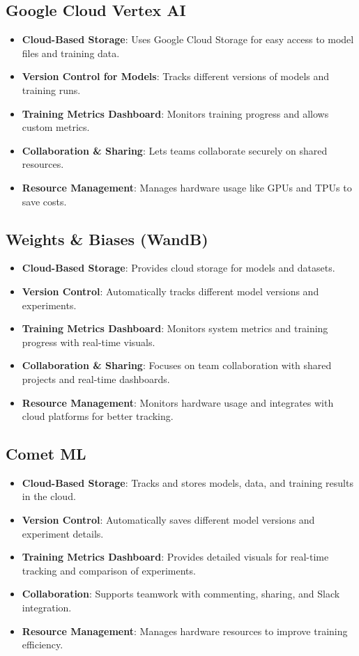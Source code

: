 \documentclass[12pt]{article}
\begin{document}
\subsection*{Google Cloud Vertex AI}
\begin{itemize}
    \item \textbf{Cloud-Based Storage}: Uses Google Cloud Storage for easy access to model files and training data.
    \item \textbf{Version Control for Models}: Tracks different versions of models and training runs.
    \item \textbf{Training Metrics Dashboard}: Monitors training progress and allows custom metrics.
    \item \textbf{Collaboration \& Sharing}: Lets teams collaborate securely on shared resources.
    \item \textbf{Resource Management}: Manages hardware usage like GPUs and TPUs to save costs.
\cite{gcv}
    
\end{itemize}

\subsection*{Weights \& Biases (WandB)}
\begin{itemize}
    \item \textbf{Cloud-Based Storage}: Provides cloud storage for models and datasets.
    \item \textbf{Version Control}: Automatically tracks different model versions and experiments.
    \item \textbf{Training Metrics Dashboard}: Monitors system metrics and training progress with real-time visuals.
    \item \textbf{Collaboration \& Sharing}: Focuses on team collaboration with shared projects and real-time dashboards.
    \item \textbf{Resource Management}: Monitors hardware usage and integrates with cloud platforms for better tracking.

\cite{wandb}
    
\end{itemize}

\subsection*{Comet ML}
\begin{itemize}
    \item \textbf{Cloud-Based Storage}: Tracks and stores models, data, and training results in the cloud.
    \item \textbf{Version Control}: Automatically saves different model versions and experiment details.
    \item \textbf{Training Metrics Dashboard}: Provides detailed visuals for real-time tracking and comparison of experiments.
    \item \textbf{Collaboration}: Supports teamwork with commenting, sharing, and Slack integration.
    \item \textbf{Resource Management}: Manages hardware resources to improve training efficiency.
\end{itemize}
\end{document}
